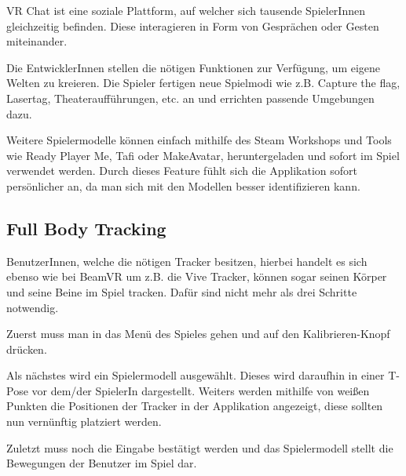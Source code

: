 VR Chat ist eine soziale Plattform, auf welcher sich tausende SpielerInnen gleichzeitig befinden.
Diese interagieren in Form von Gespr\"achen oder Gesten miteinander.

Die EntwicklerInnen stellen die n\"otigen Funktionen zur Verf\"ugung, um eigene Welten zu kreieren.
Die Spieler fertigen neue Spielmodi wie z.B. Capture the flag, Lasertag, Theaterauff\"uhrungen, etc. an und errichten passende Umgebungen dazu.

Weitere Spielermodelle k\"onnen einfach mithilfe des Steam Workshops und Tools wie Ready Player Me, Tafi oder MakeAvatar, heruntergeladen und sofort im Spiel verwendet werden.
Durch dieses Feature f\"uhlt sich die Applikation sofort pers\"onlicher an, da man sich mit den Modellen besser identifizieren kann.
~\cite{VRChat_2021_AvatarCreator}

\subsection{Full Body Tracking}
\label{sec:vrchat_fullbodytracking}
BenutzerInnen, welche die n\"otigen Tracker besitzen, hierbei handelt es sich ebenso wie bei BeamVR um z.B. die Vive Tracker, können sogar seinen K\"orper und seine Beine im Spiel tracken.
Dafür sind nicht mehr als drei Schritte notwendig.


Zuerst muss man in das Men\"u des Spieles gehen und auf den Kalibrieren-Knopf dr\"ucken.

Als n\"achstes wird ein Spielermodell ausgew\"ahlt.
Dieses wird daraufhin in einer T-Pose vor dem/der SpielerIn dargestellt.
Weiters werden mithilfe von weißen Punkten die Positionen der Tracker in der Applikation angezeigt, diese sollten nun vern\"unftig platziert werden.

Zuletzt muss noch die Eingabe best\"atigt werden und das Spielermodell stellt die Bewegungen der Benutzer im Spiel dar.
~\cite{VRChat_2021_FullBodyTracking}

